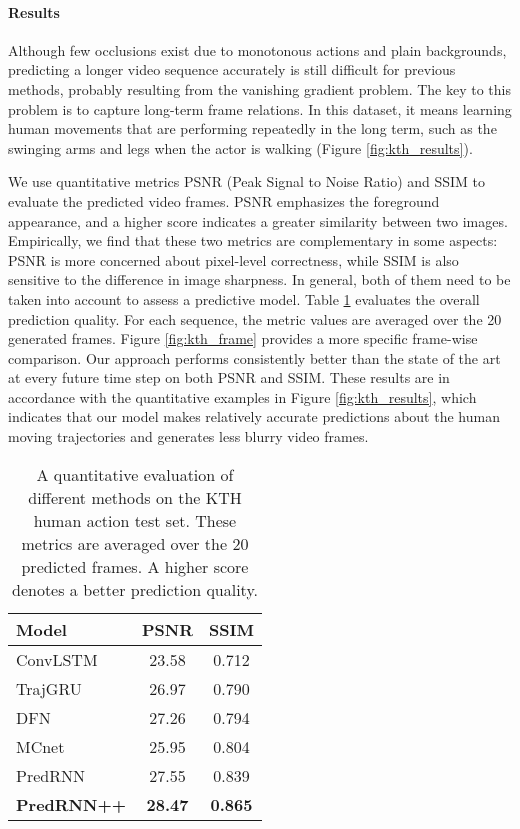 \documentclass{article}
\begin{document}
\paragraph{Results} 

Although few occlusions exist due to monotonous actions and plain backgrounds, predicting a longer video sequence accurately is still difficult for previous methods, probably resulting from the vanishing gradient problem. The key to this problem is to capture long-term frame relations. In this dataset, it means learning human movements that are performing repeatedly in the long term, such as the swinging arms and legs when the actor is walking (Figure \ref{fig:kth_results}). 

We use quantitative metrics PSNR (Peak Signal to Noise Ratio) and SSIM to evaluate the predicted video frames. PSNR emphasizes the foreground appearance, and a higher score indicates a greater similarity between two images. Empirically, we find that these two metrics are complementary in some aspects: PSNR is more concerned about pixel-level correctness, while SSIM is also sensitive to the difference in image sharpness. In general, both of them need to be taken into account to assess a predictive model. Table \ref{tab:kth_comapre} evaluates the overall prediction quality. For each sequence, the metric values are averaged over the 20 generated frames. Figure \ref{fig:kth_frame} provides a more specific frame-wise comparison. Our approach performs consistently better than the state of the art at every future time step on both PSNR and SSIM. These results are in accordance with the quantitative examples in Figure \ref{fig:kth_results}, which indicates that our model makes relatively accurate predictions about the human moving trajectories and generates less blurry video frames. 


\begin{table}[htb]
\caption{A quantitative evaluation of different methods on the KTH human action test set. These metrics are averaged over the 20 predicted frames. A higher score denotes a better prediction quality. }
\label{tab:kth_comapre}
\vskip 0.15in
\centering
\begin{small}
\begin{sc}
\begin{tabular}{lcc}
\toprule
Model & PSNR & SSIM \\
\midrule
ConvLSTM \cite{shi2015convolutional} & 23.58 & 0.712 \\
TrajGRU \cite{shi2017deep} 			 & 26.97 & 0.790 \\
DFN \cite{de2016dynamic} 			 & 27.26 & 0.794 \\
MCnet \cite{Villegas2017Decomposing} & 25.95 & 0.804 \\
PredRNN \cite{wang2017predrnn} 	 	 & 27.55 & 0.839 \\
\textbf{PredRNN++} 	& \textbf{28.47} & \textbf{0.865} \\
\bottomrule
\end{tabular}
\end{sc}
\end{small}
\end{table}
\end{document}
